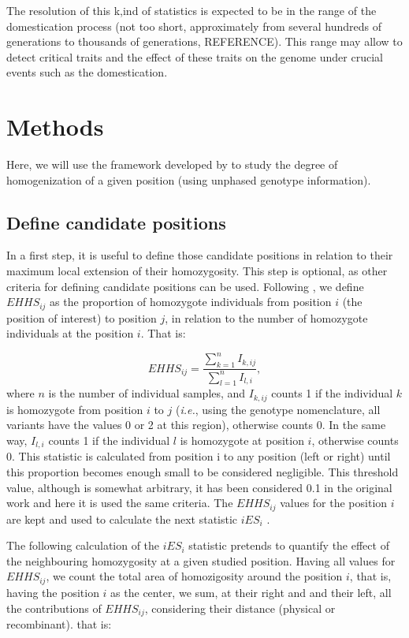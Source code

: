 \documentclass[a4paper,11pt]{article}
\begin{document}
The resolution of this k,ind of statistics is expected to be in the range of the domestication process (not too short, approximately from several hundreds of generations to  thousands of generations, REFERENCE). This range may allow to detect critical traits and the effect of these traits on the genome under crucial events such as the domestication.

\section{Methods}
Here, we will use the framework developed by \cite{Tang:2007by} to study the degree of homogenization of a given position (using unphased genotype information).
\subsection{Define candidate positions}
 In a first step, it is useful to define those candidate positions in relation to their maximum local extension of their homozygosity. This step is optional, as other criteria for defining candidate positions can be used. Following \cite{Tang:2007by}, we define $EHHS_{ij}$ as the proportion of homozygote individuals from position $i$ (the position of interest) to position $j$, in relation to the number of homozygote individuals at the position $i$. That is:
 
 \begin{equation}
 EHHS_{ij} = \frac{\sum_{k=1}^{n}I_{k,ij}}{\sum_{l=1}^{n}I_{l,i}},
 \end{equation}
where $n$ is the number of individual samples, and $I_{k,ij}$ counts 1 if the individual $k$ is homozygote from position $i$ to $j$ (\textit{i.e.}, using the genotype nomenclature, all variants have the values 0 or 2 at this region), otherwise counts 0. In the same way, $I_{l,i}$ counts 1 if the individual $l$ is homozygote at position $i$, otherwise counts 0. This statistic is calculated from position i to any position (left or right) until this proportion becomes enough small to be considered negligible. This threshold value, although is somewhat arbitrary, it has been considered 0.1 in the original work \citep{Tang:2007by} and here it is used the same criteria. The $EHHS_{ij}$ values for the position $i$ are kept and used to calculate the next statistic $iES_i$ \citep{Tang:2007by}.

The following calculation of the $iES_i$ statistic pretends to quantify the effect of the neighbouring homozygosity at a given studied position. Having all values for $EHHS_{ij}$, we count the total area of homozigosity around the position $i$, that is, having the position $i$ as the center, we sum, at their right and and their left, all the contributions of $EHHS_{ij}$, considering their distance (physical or recombinant). that is: 
\end{document}
